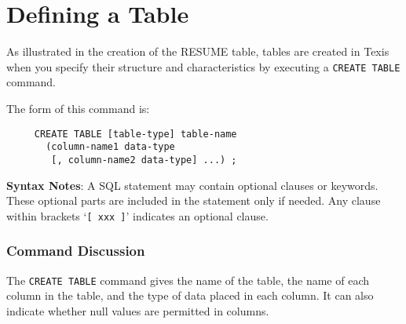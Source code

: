 \section{Defining a Table}

As illustrated in the creation of the RESUME table, tables are created
in Texis when you specify their structure and characteristics by
executing a {\tt CREATE TABLE} command.

{\samepage
The form of this command is:
\begin{verbatim}
     CREATE TABLE [table-type] table-name
       (column-name1 data-type
        [, column-name2 data-type] ...) ;
\end{verbatim}
}
{\bf Syntax Notes}:
A SQL statement may contain optional clauses or keywords.  These
optional parts are included in the statement only if needed.  Any
clause within brackets `\verb`[ xxx ]`' indicates an optional clause.

\subsubsection{Command Discussion}

The {\tt CREATE TABLE} command gives the name of the table, the name of each
column in the table, and the type of data placed in each column.  It
can also indicate whether null values are permitted in columns.

